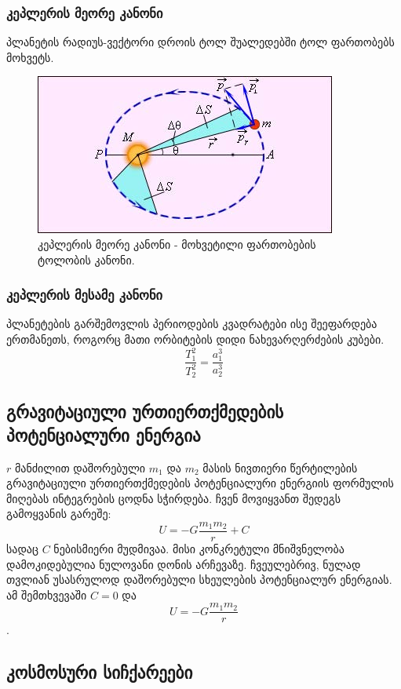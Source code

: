 \documentclass[a4paper]{book}
\begin{document}
\subsubsection{კეპლერის მეორე კანონი}
პლანეტის რადიუს-ვექტორი დროის ტოლ შუალედებში ტოლ ფართობებს მოხვეტს.
		\begin{figure}[H]
		   \centering
           \includegraphics[width=0.5\columnwidth]{figures/kepler_2_law}
           \caption{კეპლერის მეორე კანონი - მოხვეტილი ფართობების ტოლობის კანონი.}
           \label{fig:kepler_2_law}
        \end{figure}
	
\subsubsection{კეპლერის მესამე კანონი}
	პლანეტების გარშემოვლის პერიოდების კვადრატები ისე შეეფარდება ერთმანეთს, როგორც მათი ორბიტების დიდი ნახევარღერძების კუბები.
	\begin{equation}
		\frac{T_1^2}{T_2^2} = \frac{a_1^3}{a_2^3}
	\end{equation}
	
\subsection{გრავიტაციული ურთიერთქმედების პოტენციალური ენერგია}
	$r$ მანძილით დაშორებული $m_1$ და $m_2$ მასის ნივთიერი წერტილების გრავიტაციული ურთიერთქმედების პოტენციალური ენერგიის ფორმულის მიღებას ინტეგრების ცოდნა სჭირდება. ჩვენ მოვიყვანთ შედეგს გამოყვანის გარეშე:
	\begin{equation}
		U = -G\frac{m_1 m_2}{r} + C
	\end{equation}
სადაც $C$ ნებისმიერი მუდმივაა. მისი კონკრეტული მნიშვნელობა დამოკიდებულია ნულოვანი დონის არჩევაზე. ჩვეულებრივ, ნულად თვლიან
უსასრულოდ დაშორებული სხეულების პოტენციალურ ენერგიას. ამ შემთხვევაში	$C = 0$ და $$U = -G\frac{m_1 m_2}{r}$$.
	
\subsection{კოსმოსური სიჩქარეები}
\end{document}

